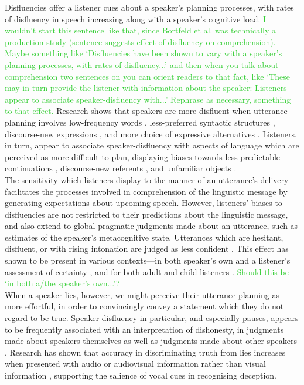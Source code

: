 \documentclass[man]{apa6}
\newcommand\thenote[1]{\textcolor{LimeGreen}{#1}}
\begin{document}
Disfluencies offer a listener cues about a speaker's planning processes, with rates of disfluency in speech increasing along with a speaker's cognitive load\citep{Bortfeld2001}. \thenote{I wouldn't start this sentence like that, since Bortfeld et al. was technically a production study (sentence suggests effect of disfluency on comprehension). Maybe something like `Disfluencies have been shown to vary with a speaker's planning processes, with rates of disfluency...' and then when you talk about comprehension two sentences on you can orient readers to that fact, like `These may in turn provide the listener with information about the speaker: Listeners appear to associate speaker-disfluency with...' Rephrase as necessary, something to that effect.}
Research shows that speakers are more disfluent when utterance planning involves low-frequency words \citep{Beattie1979}, less-preferred syntactic structures \citep{Cook2009}, discourse-new expressions \citep{Arnold2003}, and more choice of expressive alternatives \citep{Schachter1991}. 
Listeners, in turn, appear to associate speaker-disfluency with aspects of language which are perceived as more difficult to plan, displaying biases towards less predictable continuations \citep{Corley2007}, discourse-new referents \citep{Barr2001, Arnold2004}, and unfamiliar objects \citep{Arnold2007}.\\

The sensitivity which listeners display to the manner of an utterance's delivery facilitates the processes involved in comprehension of the linguistic message by generating expectations about upcoming speech. 
However, listeners' biases to disfluencies are not restricted to their predictions about the linguistic message, and also extend to global pragmatic judgments made about an utterance, such as estimates of the speaker's metacognitive state.
Utterances which are hesitant, disfluent, or with rising intonation are judged as less confident \citep{Smith1993, Brennan1995}.
This effect has shown to be present in various contexts---in both speaker's own and a listener's assessment of certainty \citep{Swerts2005}, and for both adult and child listeners \citep{Krahmer2005}. \thenote{Should this be `in both a/the speaker's own...'?}\\

When a speaker lies, however, we might perceive their utterance planning as more effortful, in order to convincingly convey a statement which they do not regard to be true.
Speaker-disfluency in particular, and especially pauses, appears to be frequently associated with an interpretation of dishonesty, in judgments made about speakers themselves as well as judgments made about other speakers \citep{Zuckerman1981}.
Research has shown that accuracy in discriminating truth from lies increases when presented with audio or audiovisual information rather than visual information \citep{Bond2006}, supporting the salience of vocal cues in recognising deception.\\
\end{document}
